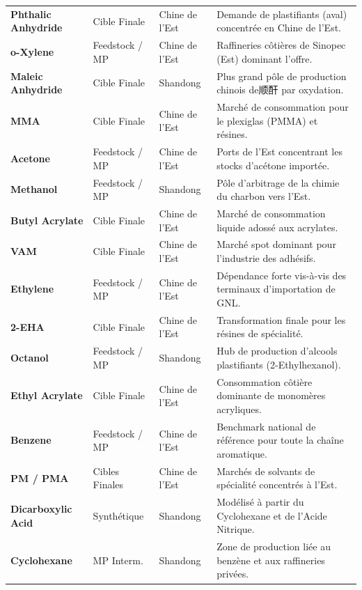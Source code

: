 \documentclass[12pt,a4paper]{article}
\begin{document}
\begin{longtable}{lllp{6.5cm}}
\midrule
\textbf{Phthalic Anhydride} & Cible Finale & Chine de l'Est & Demande de plastifiants (aval) concentrée en Chine de l'Est. \\
\addlinespace
\textbf{o-Xylene} & Feedstock / MP & Chine de l'Est & Raffineries côtières de Sinopec (Est) dominant l'offre. \\
\midrule
\textbf{Maleic Anhydride} & Cible Finale & Shandong & Plus grand pôle de production chinois de顺酐 par oxydation. \\
\midrule
\textbf{MMA} & Cible Finale & Chine de l'Est & Marché de consommation pour le plexiglas (PMMA) et résines. \\
\addlinespace
\textbf{Acetone} & Feedstock / MP & Chine de l'Est & Ports de l'Est concentrant les stocks d'acétone importée. \\
\addlinespace
\textbf{Methanol} & Feedstock / MP & Shandong & Pôle d'arbitrage de la chimie du charbon vers l'Est. \\
\midrule
\textbf{Butyl Acrylate} & Cible Finale & Chine de l'Est & Marché de consommation liquide adossé aux acrylates. \\
\midrule
\textbf{VAM} & Cible Finale & Chine de l'Est & Marché spot dominant pour l'industrie des adhésifs. \\
\addlinespace
\textbf{Ethylene} & Feedstock / MP & Chine de l'Est & Dépendance forte vis-à-vis des terminaux d'importation de GNL. \\
\midrule
\textbf{2-EHA} & Cible Finale & Chine de l'Est & Transformation finale pour les résines de spécialité. \\
\addlinespace
\textbf{Octanol} & Feedstock / MP & Shandong & Hub de production d'alcools plastifiants (2-Ethylhexanol). \\
\midrule
\textbf{Ethyl Acrylate} & Cible Finale & Chine de l'Est & Consommation côtière dominante de monomères acryliques. \\
\midrule
\textbf{Benzene} & Feedstock / MP & Chine de l'Est & Benchmark national de référence pour toute la chaîne aromatique. \\
\midrule
\textbf{PM / PMA} & Cibles Finales & Chine de l'Est & Marchés de solvants de spécialité concentrés à l'Est. \\
\midrule
\textbf{Dicarboxylic Acid} & Synthétique & Shandong & Modélisé à partir du Cyclohexane et de l'Acide Nitrique. \\
\midrule
\textbf{Cyclohexane} & MP Interm. & Shandong & Zone de production liée au benzène et aux raffineries privées. \\

\end{longtable}
\end{document}
